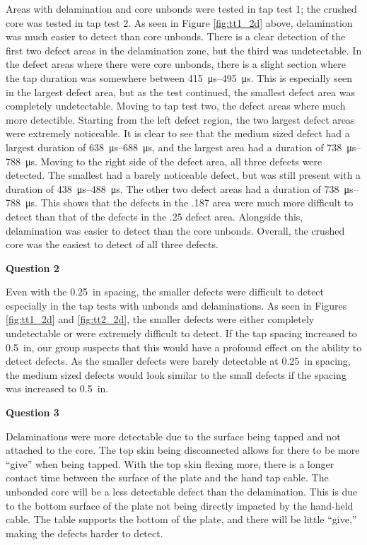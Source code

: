 \documentclass[12 pt]{report}
\begin{document}
Areas with delamination and core unbonds were tested in tap test \num{1}; the crushed core was tested in tap test \num{2}. As seen in Figure \ref{fig:tt1_2d} above, delamination was much easier to detect than core unbonds. There is a clear detection of the first two defect areas in the delamination zone, but the third was undetectable. In the defect areas where there were core unbonds, there is a slight section where the tap duration was somewhere between \qtyrange{415}{495}{\micro\second}. This is especially seen in the largest defect area, but as the test continued, the smallest defect area was completely undetectable. Moving to tap test two, the defect areas where much more detectible. Starting from the left defect region, the two largest defect areas were extremely noticeable. It is clear to see that the medium sized defect had a largest duration of \qtyrange{638}{688}{\micro\second}, and the largest area had a duration of \qtyrange{738}{788}{\micro\second}. Moving to the right side of the defect area, all three defects were detected. The smallest had a barely noticeable defect, but was still present with a duration of \qtyrange{438}{488}{\micro\second}. The other two defect areas had a duration of \qtyrange{738}{788}{\micro\second}. This shows that the defects in the .187 area were much more difficult to detect than that of the defects in the .25 defect area. Alongside this, delamination was easier to detect than the core unbonds. Overall, the crushed core was the easiest to detect of all three defects.

\textbf{Question 2}

Even with the \qty{0.25}{in} spacing, the smaller defects were difficult to detect especially in the tap tests with unbonds and delaminations. As seen in Figures \ref{fig:tt1_2d} and \ref{fig:tt2_2d}, the smaller defects were either completely undetectable or were extremely difficult to detect. If the tap spacing increased to \qty{0.5}{in}, our group suspects that this would have a profound effect on the ability to detect defects. As the smaller defects were barely detectable at \qty{0.25}{in} spacing, the medium sized defects would look similar to the small defects if the spacing was increased to \qty{0.5}{in}. 

\textbf{Question 3}

Delaminations were more detectable due to the surface being tapped and not attached to the core. The top skin being disconnected allows for there to be more ``give'' when being tapped. With the top skin flexing more, there is a longer contact time between the surface of the plate and the hand tap cable. The unbonded core will be a less detectable defect than the delamination. This is due to the bottom surface of the plate not being directly impacted by the hand-held cable. The table supports the bottom of the plate, and there will be little ``give,'' making the defects harder to detect.
\end{document}
